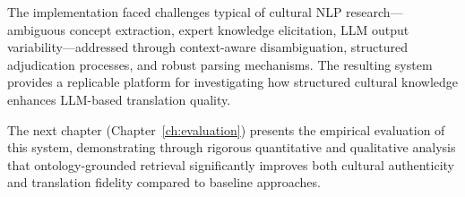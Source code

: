 The implementation faced challenges typical of cultural NLP research—ambiguous concept extraction, expert knowledge elicitation, LLM output variability—addressed through context-aware disambiguation, structured adjudication processes, and robust parsing mechanisms. The resulting system provides a replicable platform for investigating how structured cultural knowledge enhances LLM-based translation quality.

The next chapter (Chapter~\ref{ch:evaluation}) presents the empirical evaluation of this system, demonstrating through rigorous quantitative and qualitative analysis that ontology-grounded retrieval significantly improves both cultural authenticity and translation fidelity compared to baseline approaches.
